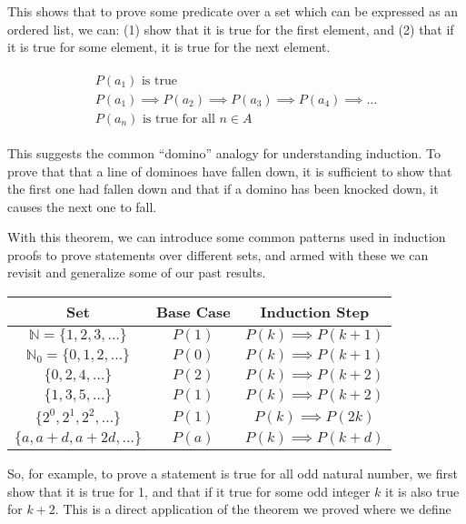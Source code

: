 \documentclass[twoside]{report}
\begin{document}
\vspace{\baselineskip}

This shows that to prove some predicate over a set which can be expressed as an ordered list, we can: (1) show that it is true for the first element, and (2) that if it is true for some element, it is true for the next element.

\begin{align*}
	\begin{array}{l}
		P(a_1) \text{ is true} \\
		P(a_1) \implies P(a_2) \implies P(a_3) \implies P(a_4) \implies \dots \\
		\hline
		P(a_n) \text{ is true for all } n \in A
	\end{array}
\end{align*}

This suggests the common ``domino'' analogy for understanding induction. To prove that that a line of dominoes have fallen down, it is sufficient to show that the first one had fallen down and that if a domino has been knocked down, it causes the next one to fall.

With this theorem, we can introduce some common patterns used in induction proofs to prove statements over different sets, and armed with these we can revisit and generalize some of our past results.


\vspace{\baselineskip}
\begin{center}
	\begin{tabular}{ccc}
		\toprule
		Set & Base Case & Induction Step \\
		\midrule
		$\mathbb{N} = \{ 1, 2, 3, \dots \}$ & $P(1)$ & $P(k) \implies P(k + 1)$ \\
		$\mathbb{N}_0 = \{ 0, 1, 2, \dots \}$ & $P(0)$ & $P(k) \implies P(k + 1)$ \\
		$\{ 0, 2, 4, \dots \}$ & $P(2)$ & $P(k) \implies P(k + 2)$ \\
		$\{ 1, 3, 5, \dots \}$ & $P(1)$ & $P(k) \implies P(k + 2)$ \\
		$\{ 2^0, 2^1, 2^2, \dots \}$ & $P(1)$ & $P(k) \implies P(2k)$ \\
		$\{ a, a + d, a + 2d, \dots \}$ & $P(a)$ & $P(k) \implies P(k + d)$ \\
		\bottomrule
	\end{tabular}
\end{center}
\vspace{\baselineskip}

So, for example, to prove a statement is true for all odd natural number, we first show that it is true for 1, and that if it true for some odd integer $k$ it is also true for $k + 2$. This is a direct application of the theorem we proved where we define
\end{document}
